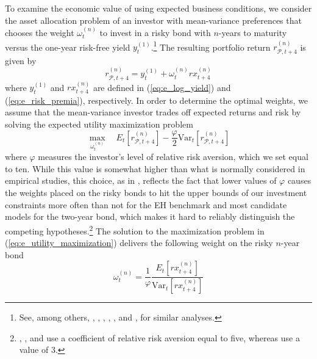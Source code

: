 \documentclass[12pt,letterpaper,leqno,doublespacing]{article}
\begin{document}
To examine the economic value of using expected business conditions, we consider the asset allocation problem of an investor with mean-variance preferences that chooses the weight $\omega_{t}^{\left(n\right)}$ to invest in a risky bond with $n$-years to maturity versus the one-year risk-free yield $y_{t}^{\left(1\right)}$.\footnote{See, among others, \cite{CampbellThompson2008}, \cite{DanglHalling2012}, \cite{ThorntonValente2012}, \cite{RapachZhou2013}, \cite{GarganoPettenuzzoTimmermann2014}, and \cite{SarnoSchneiderWagner2014}, for similar analyses.} The resulting portfolio return $r_{\mathcal{P},t+4}^{\left(n\right)}$ is given by
\begin{equation}
    r_{\mathcal{P},t+4}^{\left(n\right)} = y_{t}^{\left(1\right)} + \omega_{t}^{\left(n\right)} rx_{t+4}^{\left(n\right)}
    \label{eq:e_portfolio_return}
\end{equation}
where $y_{t}^{\left(1\right)}$ and $rx_{t+4}^{\left(n\right)}$ are defined in (\ref{eq:e_log_yield}) and (\ref{eq:e_risk_premia}), respectively. In order to determine the optimal weights, we assume that the mean-variance investor trades off expected returns and risk by solving the expected utility maximization problem 
\begin{equation}
    \displaystyle{\max_{\omega_{t}^{\left(n\right)}}} \quad E_{t}\left[r_{\mathcal{P},t+4}^{\left(n\right)}\right] - \frac{\varphi}{2} \text{Var}_{t}\left[r_{\mathcal{P},t+4}^{\left(n\right)}\right]
    \label{eq:e_utility_maximization}
\end{equation} 
where $\varphi$ measures the investor's level of relative risk aversion, which we set equal to ten. While this value is somewhat higher than what is normally considered in empirical studies, this choice, as in \cite{GarganoPettenuzzoTimmermann2014}, reflects the fact that lower values of $\varphi$ causes the weights placed on the risky bonds to hit the upper bounds of our investment constraints more often than not for the EH benchmark and most candidate models for the two-year bond, which makes it hard to reliably distinguish the competing hypotheses.\footnote{\cite{CampbellThompson2008}, \cite{ThorntonValente2012}, and \cite{RapachZhou2013} use a coefficient of relative risk aversion equal to five, whereas \cite{SarnoSchneiderWagner2014} use a value of 3.} The solution to the maximization problem in (\ref{eq:e_utility_maximization}) delivers the following weight on the risky $n$-year bond
\begin{equation}
    \omega_{t}^{\left(n\right)} = \frac{1}{\varphi} \frac{E_{t}\left[rx_{t+4}^{\left(n\right)}\right]}{\text{Var}_{t}\left[rx_{t+4}^{\left(n\right)}\right]}
    \label{eq:e_risky_weight}
\end{equation} 
\end{document}
